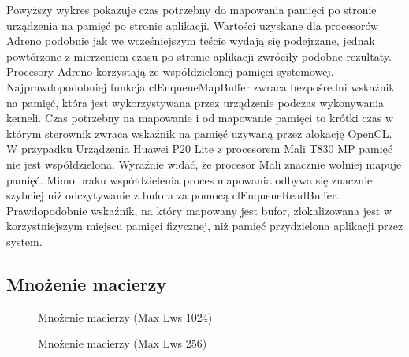 Powyższy wykres pokazuje czas potrzebny do mapowania pamięci po stronie urządzenia na pamięć po stronie aplikacji. Wartości uzyskane dla procesorów Adreno podobnie jak we wcześniejszym teście wydają się podejrzane, jednak powtórzone z mierzeniem czasu po stronie aplikacji zwróciły podobne rezultaty. Procesory Adreno korzystają ze współdzielonej pamięci systemowej. Najprawdopodobniej  funkcja clEnqueueMapBuffer zwraca bezpośredni wskaźnik na pamięć, która jest wykorzystywana przez urządzenie podczas wykonywania kerneli. Czas potrzebny na mapowanie i od mapowanie pamięci to krótki czas w którym sterownik zwraca wskaźnik na pamięć używaną przez alokację OpenCL. W przypadku Urządzenia Huawei P20 Lite z procesorem Mali T830 MP pamięć nie jest współdzielona. Wyraźnie widać, że procesor Mali znacznie wolniej mapuje pamięć. Mimo braku współdzielenia proces mapowania odbywa się znacznie szybciej niż odczytywanie z bufora za pomocą clEnqueueReadBuffer. Prawdopodobnie wskaźnik, na który mapowany jest bufor, zlokalizowana jest w korzystniejszym miejscu pamięci fizycznej, niż pamięć przydzielona aplikacji przez system.

\subsection[Mnożenie macierzy]{Mnożenie macierzy}
\begin{figure}[H]
\caption{Mnożenie macierzy (Max Lws 1024)}
\end{figure}

\begin{figure}[H]
\caption{Mnożenie macierzy (Max Lws 256)}
\end{figure}

